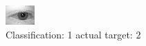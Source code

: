 \begin{figure}[h!]
\begin{center}
\includegraphics[width=0.60\columnwidth]{figures/ID485_class_1_target_2.png}
\end{center}
\caption{ Classification: 1 actual target: 2}
\label{fig:ID485_class_1_target_2}
\end{figure}
